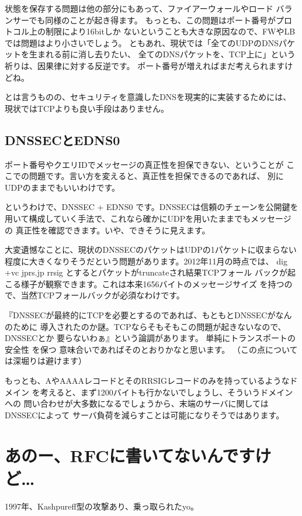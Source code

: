 状態を保存する問題は他の部分にもあって、ファイアーウォールやロード
バランサーでも同様のことが起き得ます。
もっとも、この問題はポート番号がプロトコル上の制限により16bitしか
ないということも大きな原因なので、FWやLBでは問題はより小さいでしょう。 
ともあれ、現状では「全てのUDPのDNSパケットを生まれる前に消し去りたい、
全てのDNSパケットを、TCP上に」という祈りは、因果律に対する反逆です。
ポート番号が増えればまだ考えられますけどね。

とは言うものの、セキュリティを意識したDNSを現実的に実装するためには、
現状ではTCPよりも良い手段はありません。

\subsection{DNSSECとEDNS0}
ポート番号やクエリIDでメッセージの真正性を担保できない、ということが
ここでの問題です。言い方を変えると、真正性を担保できるのであれば、
別にUDPのままでもいいわけです。

というわけで、DNSSEC + EDNS0 です。DNSSECは信頼のチェーンを公開鍵を
用いて構成していく手法で、これなら確かにUDPを用いたままでもメッセージの
真正性を確認できます。いや、できそうに見えます。

大変遺憾なことに、現状のDNSSECのパケットはUDPの1パケットに収まらない
程度に大きくなりそうだという問題があります。2012年11月の時点では、
 dig +vc jprs.jp rrsig とするとパケットがtruncateされ結果TCPフォール
バックが起こる様子が観察できます。これは本来1656バイトのメッセージサイズ
を持つので、当然TCPフォールバックが必須なわけです。 %

『DNSSECが最終的にTCPを必要とするのであれば、もともとDNSSECがなんのために
導入されたのか謎。TCPならそもそもこの問題が起きないなので、 DNSSECとか
要らないわぁ』という論調があります。 単純にトランスポートの安全性 を保つ
意味合いであればそのとおりかなと思います。
（この点については深堀りは避けます） %

もっとも、AやAAAAレコードとそのRRSIGレコードのみを持っているようなドメイン
を考えると、まず1200バイトも行かないでしょうし、そういうドメインへの
問い合わせが大多数になるでしょうから、末端のサーバに関してはDNSSECによって
サーバ負荷を減らすことは可能になりそうではあります。

\section{あのー、RFCに書いてないんですけど…}
1997年、Kashpureff型の攻撃あり、乗っ取られたyo。

